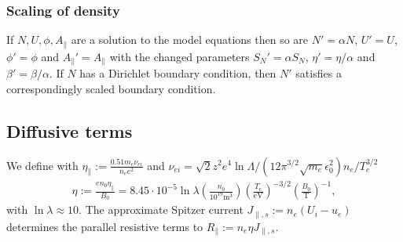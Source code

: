 \subsubsection{Scaling of density}
If $N, U, \phi, A_\parallel$ are a solution to the model equations
then so are $N'=\alpha N$, $U'=U$, $\phi'=\phi$ and $A_\parallel'=A_\parallel$ with the changed parameters $S_N' = \alpha S_N$, $\eta' = \eta/\alpha$ and $ \beta' = \beta/\alpha$. If $N$
has a Dirichlet boundary condition, then $N'$ satisfies a correspondingly scaled boundary condition.


\subsection{Diffusive terms}\label{sec:dissres}
We define with
$\eta_\parallel := \frac{0.51 m_e \nu_{ei}}{n_e e^2}$ and $\nu_{ei} = \sqrt{2} z^2 e^4 \ln \Lambda/ (12\pi^{3/2} \sqrt{m_e} \epsilon_0^2) n_e /T_e^{3/2}$
\begin{align}
  \eta:=\frac{en_0\eta_\parallel}{B_0} = 8.45\cdot 10^{-5}\ln \lambda \left(\frac{n_0}{10^{19}\text{m}^3}\right) \left(\frac{T_e}{\text{eV}}\right)^{-3/2} \left(\frac{B_0}{\text{T}}\right)^{-1},
    \label{eq:resistivity}
\end{align}
with $\ln \lambda \approx 10$.
 The approximate Spitzer current \(J_{\parallel,s}:= n_e \left(U_i - u_e\right)\)
 determines the parallel resistive terms to $R_\parallel:= n_e\eta J_{\parallel,s}$.

